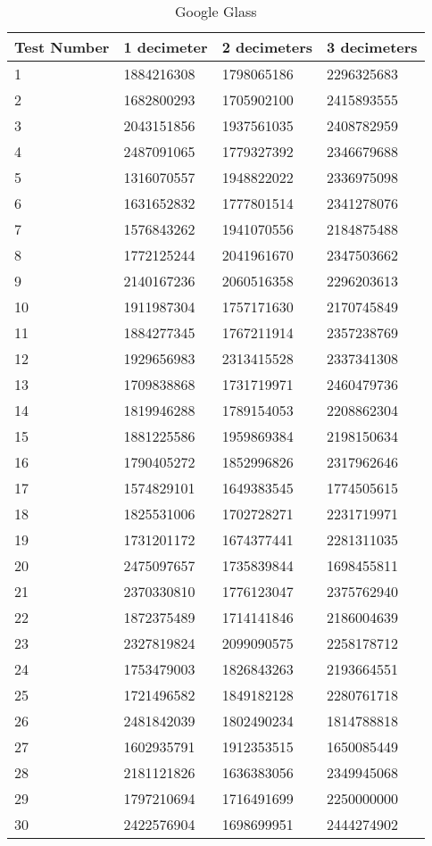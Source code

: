 	\begin{table}[ht!]
    		\caption{Google Glass} \label{tab:distamceSmartphoneFull}
		\centering \begin{tabularx}{\textwidth}{l|X|X|X} \hline
		\textbf{Test Number} & \textbf{1 decimeter} & \textbf{2 decimeters} & \textbf{3 decimeters} \\ \hline \hline
       
		1&	1884216308	&	1798065186	&	2296325683	\\ \hline
		2&	1682800293	&	1705902100	&	2415893555	\\ \hline
		3&	2043151856	&	1937561035	&	2408782959	\\ \hline
		4&	2487091065	&	1779327392	&	2346679688	\\ \hline
		5&	1316070557	&	1948822022	&	2336975098	\\ \hline
		6&	1631652832	&	1777801514	&	2341278076	\\ \hline
		7&	1576843262	&	1941070556	&	2184875488	\\ \hline
		8&	1772125244	&	2041961670	&	2347503662	\\ \hline
		9&	2140167236	&	2060516358	&	2296203613	\\ \hline
		10&	1911987304	&	1757171630	&	2170745849	\\ \hline
		11&	1884277345	&	1767211914	&	2357238769	\\ \hline
		12&	1929656983	&	2313415528	&	2337341308	\\ \hline
		13&	1709838868	&	1731719971	&	2460479736	\\ \hline
		14&	1819946288	&	1789154053	&	2208862304	\\ \hline
		15&	1881225586	&	1959869384	&	2198150634	\\ \hline
		16&	1790405272	&	1852996826	&	2317962646	\\ \hline
		17&	1574829101	&	1649383545	&	1774505615	\\ \hline
		18&	1825531006	&	1702728271	&	2231719971	\\ \hline
		19&	1731201172	&	1674377441	&	2281311035	\\ \hline
		20&	2475097657	&	1735839844	&	1698455811	\\ \hline
		21&	2370330810	&	1776123047	&	2375762940	\\ \hline
		22&	1872375489	&	1714141846	&	2186004639	\\ \hline
		23&	2327819824	&	2099090575	&	2258178712	\\ \hline
		24&	1753479003	&	1826843263	&	2193664551	\\ \hline
		25&	1721496582	&	1849182128	&	2280761718	\\ \hline
		26&	2481842039	&	1802490234	&	1814788818	\\ \hline
		27&	1602935791	&	1912353515	&	1650085449	\\ \hline
		28&	2181121826	&	1636383056	&	2349945068	\\ \hline
		29&	1797210694	&	1716491699	&	2250000000	\\ \hline
		30&	2422576904	&	1698699951	&	2444274902	\\ \hline

		\end{tabularx}
	\end{table}

